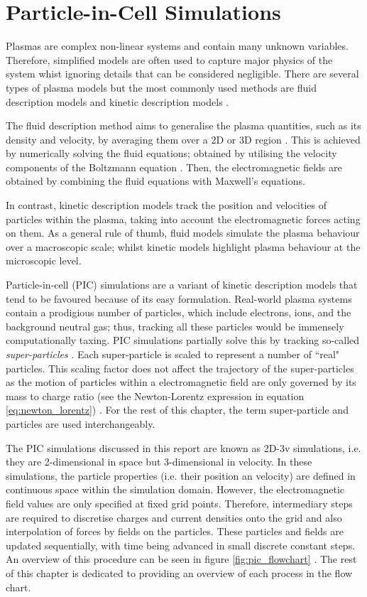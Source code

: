 \chapter{Particle-in-Cell Simulations}

\label{ch:particle_in_cell}


Plasmas are complex non-linear systems and contain many unknown variables. Therefore, simplified models are often used to capture major physics of the system whist ignoring details that can be considered negligible. There are several types of plasma models but the most commonly used methods are fluid description models and kinetic description models \cite{Kim2005}. 

The fluid description method aims to generalise the plasma quantities, such as its density and velocity, by averaging them over a 2D or 3D region . This is achieved by numerically solving the fluid equations; obtained by utilising the velocity components of the Boltzmann equation \cite{Kim2005}. Then, the electromagnetic fields are obtained by combining the fluid equations with Maxwell's equations. 

In contrast, kinetic description models track the position and velocities of particles within the plasma, taking into account the electromagnetic forces acting on them. As a general rule of thumb, fluid models simulate the plasma behaviour over a macroscopic scale; whilst kinetic models highlight plasma behaviour at the microscopic level.

Particle-in-cell (PIC) simulations are a variant of kinetic description models that tend to be favoured because of its easy formulation. Real-world plasma systems contain a prodigious number of particles, which include electrons, ions, and the background neutral gas; thus, tracking all these particles would be immensely computationally taxing. PIC simulations partially solve this by tracking so-called \textit{super-particles} \cite{Tskhakaya2007}. Each super-particle is scaled to represent a number of ``real" particles. This scaling factor does not affect the trajectory of the super-particles as the motion of particles within a electromagnetic field are only governed by its mass to charge ratio (see the Newton-Lorentz expression in equation \ref{eq:newton_lorentz}) \cite{Tskhakaya2007}. For the rest of this chapter, the term super-particle and particles are used interchangeably.

The PIC simulations discussed in this report are known as 2D-3v simulations, i.e. they are 2-dimensional in space but 3-dimensional in velocity. In these simulations, the particle properties (i.e. their position an velocity) are defined in continuous space within the simulation domain. However, the electromagnetic field values are only specified at fixed grid points. Therefore, intermediary steps are required to discretise charges and current densities onto the grid and also interpolation of forces by fields on the particles. These particles and fields are updated sequentially, with time being advanced in small discrete constant steps. An overview of this procedure can be seen in figure \ref{fig:pic_flowchart} \cite{Birdsall1991}. The rest of this chapter is dedicated to providing an overview of each process in the flow chart.

